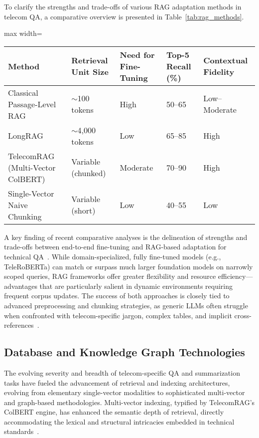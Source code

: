 To clarify the strengths and trade-offs of various RAG adaptation methods in telecom QA, a comparative overview is presented in Table~\ref{tab:rag_methods}.

\begin{table*}[htbp]
\centering
\caption{Comparative Properties of RAG Adaptation Strategies in Telecom Question Answering}
\label{tab:rag_methods}
\begin{adjustbox}{max width=\textwidth}
\begin{tabular}{lllll}
\toprule
\textbf{Method} & \textbf{Retrieval Unit Size} & \textbf{Need for Fine-Tuning} & \textbf{Top-5 Recall (\%)} & \textbf{Contextual Fidelity} \\
\midrule
Classical Passage-Level RAG & \(\sim\)100 tokens & High & 50--65 & Low--Moderate \\
LongRAG & \(\sim\)4,000 tokens & Low & 65--85 & High \\
TelecomRAG (Multi-Vector ColBERT) & Variable (chunked) & Moderate & 70--90 & High \\
Single-Vector Naive Chunking & Variable (short) & Low & 40--55 & Low \\
\bottomrule
\end{tabular}
\end{adjustbox}
\end{table*}

A key finding of recent comparative analyses is the delineation of strengths and trade-offs between end-to-end fine-tuning and RAG-based adaptation for technical QA~\cite{ref22,ref26}. While domain-specialized, fully fine-tuned models (e.g., TeleRoBERTa) can match or surpass much larger foundation models on narrowly scoped queries, RAG frameworks offer greater flexibility and resource efficiency---advantages that are particularly salient in dynamic environments requiring frequent corpus updates. The success of both approaches is closely tied to advanced preprocessing and chunking strategies, as generic LLMs often struggle when confronted with telecom-specific jargon, complex tables, and implicit cross-references~\cite{ref22}.

\subsection{Database and Knowledge Graph Technologies}

The evolving severity and breadth of telecom-specific QA and summarization tasks have fueled the advancement of retrieval and indexing architectures, evolving from elementary single-vector modalities to sophisticated multi-vector and graph-based methodologies. Multi-vector indexing, typified by TelecomRAG's ColBERT engine, has enhanced the semantic depth of retrieval, directly accommodating the lexical and structural intricacies embedded in technical standards~\cite{ref20,ref21}.


